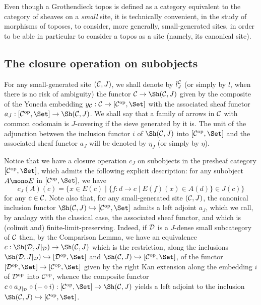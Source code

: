 \documentclass[a4paper,12pt]{article}
\begin{document}
Even though a Grothendieck topos is defined as a category equivalent to the category of sheaves on a \emph{small} site, it is technically convenient, in the study of morphisms of toposes, to consider, more generally, small-generated sites, in order to be able in particular to consider a topos as a site (namely, its canonical site).


\subsection{The closure operation on subobjects}

For any small-generated site $({\cal C}, J)$, we shall denote by $l_{J}^{{\cal C}}$ (or simply by $l$, when there is no risk of ambiguity) the functor ${\cal C}\to \Sh({\cal C}, J)$ given by the composite of the Yoneda embedding $y_{\cal C}:{\cal C}\to [{\cal C}^\textup{op}, \Set]$ with the associated sheaf functor $a_{J}:[{\cal C}^\textup{op}, \Set] \to \Sh({\cal C}, J)$. We shall say that a family of arrows in $\cal C$ with common codomain is $J$-covering if the sieve generated by it is. The unit of the adjunction between the inclusion functor $i$ of $\Sh({\cal C}, J)$ into $[{\cal C}^\textup{op}, \Set]$ and the associated sheaf functor $a_{J}$ will be denoted by $\eta_{J}$ (or simply by $\eta$).

Notice that we have a closure operation $c_{J}$ on subobjects in the presheaf category $[{\cal C}^\textup{op}, \Set]$, which admits the following explicit description: for any subobject $A\mono E$ in $[{\cal C}^\textup{op}, \Set]$, we have
\[
c_{J}(A)(c)=\{x\in E(c) \mid \{f:d\to c \mid E(f)(x)\in A(d)\}\in J(c)\}
\]   
for any $c\in {\cal C}$. Note also that, for any small-generated site $({\cal C}, J)$, the canonical inclusion functor $\Sh({\cal C}, J)\hookrightarrow [{\cal C}^{\textup{op}}, \Set]$ admits a left adjoint $a_{J}$, which we call, by analogy with the classical case, the associated sheaf functor, and which is (colimit and) finite-limit-preserving. Indeed, if $\cal D$ is a $J$-dense small subcategory of $\cal C$ then, by the Comparison Lemma, we have an equivalence $c:\Sh({\cal D}, J|_{\cal D})\to \Sh({\cal C}, J)$ which is the restriction, along the inclusions $\Sh({\cal D}, J|_{\cal D})\hookrightarrow [{\cal D}^{\textup{op}}, \Set]$ and $\Sh({\cal C}, J)\hookrightarrow [{\cal C}^{\textup{op}}, \Set]$, of the functor $[{\cal D}^{\textup{op}}, \Set]\to [{\cal C}^{\textup{op}}, \Set]$ given by the right Kan extension along the embedding $i$ of ${\cal D}^{\textup{op}}$ into ${\cal C}^{\textup{op}}$, whence the composite functor $c\circ a_{J|_{\cal D}}\circ (-\circ i):[{\cal C}^{\textup{op}}, \Set] \to \Sh({\cal C}, J)$ yields a left adjoint to the inclusion $\Sh({\cal C}, J)\hookrightarrow [{\cal C}^{\textup{op}}, \Set]$.
\end{document}
